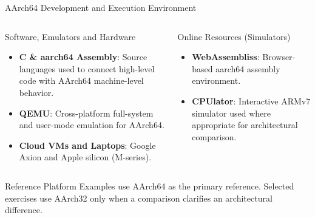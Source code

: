 \documentclass[aspectratio=169,11pt,t]{beamer}
\newcommand{\key}[1]{\textbf{#1}}
\begin{document}
\begin{frame}{AArch64 Development and Execution Environment}

\vspace{-0.25cm}

\begin{columns}[T,onlytextwidth]


\begin{block}{Software, Emulators and Hardware}
\begin{itemize}
  \item \key{C \& aarch64 Assembly}:
        Source languages used to connect high-level code
        with AArch64 machine-level behavior.

  \item \key{QEMU}:
        Cross-platform full-system and user-mode emulation
        for AArch64.

  \item \key{Cloud VMs and Laptops}:
        Google Axion and Apple silicon (M-series).
\end{itemize}
\end{block}


\begin{block}{Online Resources (Simulators)}
\begin{itemize}
  \item \key{WebAssembliss}:
        Browser-based aarch64 assembly environment.

  \item \key{CPUlator}:
        Interactive ARMv7 simulator used where appropriate
        for architectural comparison.
\end{itemize}
\end{block}

\end{columns}

\begin{block}{Reference Platform}
Examples use AArch64 as the primary reference.
Selected exercises use AArch32 only when a comparison
clarifies an architectural difference.
\end{block}

\end{frame}

\end{document}
